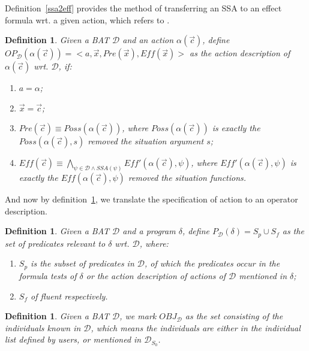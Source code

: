 \documentclass[letterpaper]{article}
\newtheorem{DEFINITION}[theorem]{Definition}
\newenvironment{definition}{\begin{DEFINITION} \rm }
                            {\end{DEFINITION}}
\begin{document}
Definition~\ref{ssa2eff} provides the method of transferring an SSA to an effect formula wrt. a given action, which refers to \cite{Rei01}.

\begin{definition}\label{action description}
Given a BAT $\mathcal{D}$ and an action $\alpha(\vec{c})$, define $OP_{\mathcal{D}} (\alpha(\vec{c})) = <a, \vec{x}, Pre(\vec{x}), Eff(\vec{x})>$ as the \emph{action description of $\alpha(\vec{c})$ wrt. $\mathcal{D}$}, if:
\begin{enumerate}
  \item $a = \alpha$;
  \item $\vec{x} = \vec{c}$;
  \item $Pre(\vec{c}) \equiv Poss(\alpha(\vec{c}))$, where $Poss(\alpha(\vec{c}))$ is exactly the $Poss(\alpha(\vec{c}), s)$ removed the situation argument $s$;
  \item $Eff(\vec{c}) \equiv \bigwedge_{\psi \in \mathcal{D} \wedge SSA(\psi)} Eff'(\alpha(\vec{c}), \psi)$, where $Eff'(\alpha(\vec{c}), \psi)$ is exactly the $Eff(\alpha(\vec{c}), \psi)$ removed the situation functions.
\end{enumerate}
\end{definition}

And now by definition~\ref{action description}, we translate the specification of action to an operator description.

\begin{definition}
Given a BAT $\mathcal{D}$ and a program $\delta$, define $P_{\mathcal{D}}(\delta) = S_p \cup S_f$ as the \emph{set of predicates relevant to $\delta$ wrt. $\mathcal{D}$}, where:
\begin{enumerate}
  \item $S_p$ is the subset of predicates in $\mathcal{D}$, of which the predicates occur in the formula tests of $\delta$ or the action description of actions of $\mathcal{D}$ mentioned in $\delta$;
  \item $S_f$ of fluent respectively.
\end{enumerate}
\end{definition}

\begin{definition}
Given a BAT $\mathcal{D}$, we mark $OBJ_{\mathcal{D}}$ as the set consisting of the individuals known in $\mathcal{D}$, which means the individuals are either in the individual list defined by users, or mentioned in $\mathcal{D}_{S_0}$.
\end{definition}
\end{document}
